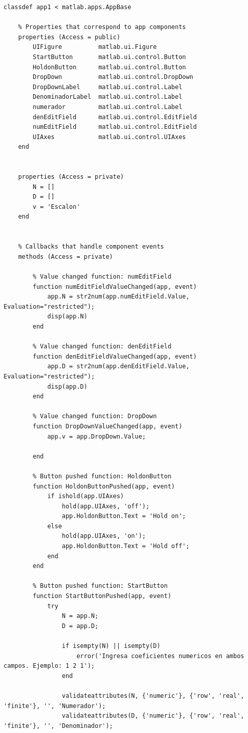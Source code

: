 \begin{lstlisting}
classdef app1 < matlab.apps.AppBase

    % Properties that correspond to app components
    properties (Access = public)
        UIFigure          matlab.ui.Figure
        StartButton       matlab.ui.control.Button
        HoldonButton      matlab.ui.control.Button
        DropDown          matlab.ui.control.DropDown
        DropDownLabel     matlab.ui.control.Label
        DenominadorLabel  matlab.ui.control.Label
        numerador         matlab.ui.control.Label
        denEditField      matlab.ui.control.EditField
        numEditField      matlab.ui.control.EditField
        UIAxes            matlab.ui.control.UIAxes
    end

    
    properties (Access = private)
        N = []
        D = []
        v = 'Escalon'
    end
    

    % Callbacks that handle component events
    methods (Access = private)

        % Value changed function: numEditField
        function numEditFieldValueChanged(app, event)
            app.N = str2num(app.numEditField.Value, Evaluation="restricted");
            disp(app.N)
        end

        % Value changed function: denEditField
        function denEditFieldValueChanged(app, event)
            app.D = str2num(app.denEditField.Value, Evaluation="restricted");
            disp(app.D)
        end

        % Value changed function: DropDown
        function DropDownValueChanged(app, event)
            app.v = app.DropDown.Value;
            
        end

        % Button pushed function: HoldonButton
        function HoldonButtonPushed(app, event)
            if ishold(app.UIAxes)
                hold(app.UIAxes, 'off');
                app.HoldonButton.Text = 'Hold on';
            else
                hold(app.UIAxes, 'on');
                app.HoldonButton.Text = 'Hold off';
            end
        end

        % Button pushed function: StartButton
        function StartButtonPushed(app, event)
            try
                N = app.N;
                D = app.D;

                if isempty(N) || isempty(D)
                    error('Ingresa coeficientes numericos en ambos campos. Ejemplo: 1 2 1');
                end

                validateattributes(N, {'numeric'}, {'row', 'real', 'finite'}, '', 'Numerador');
                validateattributes(D, {'numeric'}, {'row', 'real', 'finite'}, '', 'Denominador');


\end{lstlisting}
